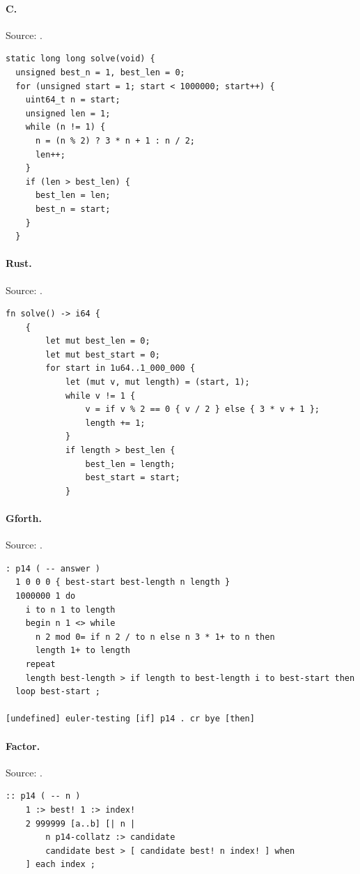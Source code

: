 \paragraph{C.} Source: .
\begin{lstlisting}
static long long solve(void) {
  unsigned best_n = 1, best_len = 0;
  for (unsigned start = 1; start < 1000000; start++) {
    uint64_t n = start;
    unsigned len = 1;
    while (n != 1) {
      n = (n % 2) ? 3 * n + 1 : n / 2;
      len++;
    }
    if (len > best_len) {
      best_len = len;
      best_n = start;
    }
  }
\end{lstlisting}

\paragraph{Rust.} Source: .
\begin{lstlisting}
fn solve() -> i64 {
    {
        let mut best_len = 0;
        let mut best_start = 0;
        for start in 1u64..1_000_000 {
            let (mut v, mut length) = (start, 1);
            while v != 1 {
                v = if v % 2 == 0 { v / 2 } else { 3 * v + 1 };
                length += 1;
            }
            if length > best_len {
                best_len = length;
                best_start = start;
            }
\end{lstlisting}

\paragraph{Gforth.} Source: .
\begin{lstlisting}
: p14 ( -- answer )
  1 0 0 0 { best-start best-length n length }
  1000000 1 do
    i to n 1 to length
    begin n 1 <> while
      n 2 mod 0= if n 2 / to n else n 3 * 1+ to n then
      length 1+ to length
    repeat
    length best-length > if length to best-length i to best-start then
  loop best-start ;

[undefined] euler-testing [if] p14 . cr bye [then]
\end{lstlisting}

\paragraph{Factor.} Source: .
\begin{lstlisting}
:: p14 ( -- n )
    1 :> best! 1 :> index!
    2 999999 [a..b] [| n |
        n p14-collatz :> candidate
        candidate best > [ candidate best! n index! ] when
    ] each index ;
\end{lstlisting}

